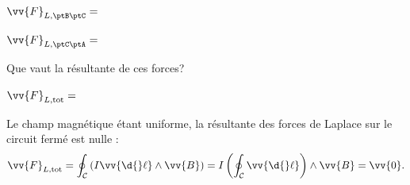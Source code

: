

\begin{enonce}
$\vv{F}_{L,\ptB\ptC}=$
\end{enonce}




\begin{enonce}
$\vv{F}_{L,\ptC\ptA}=$
\end{enonce}



\pauseEntrainement




\smallskip

Que vaut la résultante de ces forces?

\minusSmallskip

\repriseEntrainement


\begin{enonce}
$\vv{F}_{L,\text{tot}} =$
\end{enonce}

\begin{corrigeNewpage}
Le champ magnétique étant uniforme, la résultante des forces de Laplace
sur le circuit fermé est nulle :
\[
\vv{F}_{L,\text{tot}} = \oint_{\mathcal{C}}\left(I\vv{\d{}\ell}\land\vv{B}\right)=I\left(\oint_{\mathcal{C}}\vv{\d{}\ell}\right)\land\vv{B}=\vv{0}.
\]
\end{corrigeNewpage}


